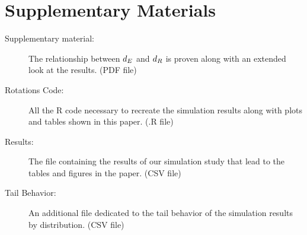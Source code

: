 \section*{Supplementary Materials}

\begin{description}

\item[Supplementary material:] The relationship between ${d_E}$ and ${d_R}$ is proven along with an extended look at the results. (PDF file)

\item[Rotations Code:] All the R code necessary to recreate the simulation results along with plots and tables shown in this paper. (.R file)

\item[Results:] The file containing the results of our simulation study that lead to the tables and figures in the paper. (CSV file)

\item[Tail Behavior:] An additional file dedicated to the tail behavior of the simulation results by distribution. (CSV file)

\end{description}


